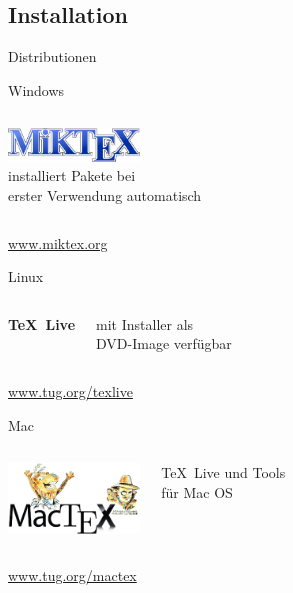 \subsection{Installation}

\begin{Frame}[t]{Distributionen}
  \begin{Block}{Windows}
    \begin{columns}
      \column{1mm}
      \column{5cm}
      \vskip2pt\par
      \includegraphics[width=3.5cm]{images/miktex}\\

      \column{5cm}
      installiert Pakete bei\\ erster Verwendung automatisch
    \end{columns}

    \url{www.miktex.org}
  \end{Block}

  \begin{Block}{Linux}
    \begin{columns}
      \column{1mm}
      \column{5cm}
      \vskip4pt\par
      \textcolor{texlive}{\Huge\bfseries\TeX\ Live}

      \column{5cm}
      mit Installer als\\ DVD-Image verfügbar
    \end{columns}

    \url{www.tug.org/texlive}
  \end{Block}

  \begin{Block}{Mac}
    \begin{columns}
      \column{1mm}
      \column{4.5cm}
      \includegraphics[width=3.5cm]{images/mactex}

      \column{5cm}
      \TeX\ Live und Tools\\ für Mac OS
    \end{columns}

    \url{www.tug.org/mactex}
  \end{Block}
\end{Frame}

